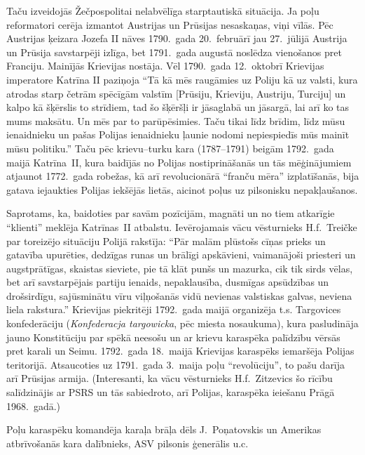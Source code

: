 \documentclass[twoside,a5paper,12pt,fleqn,openany]{extbook}
\newcommand{\pltxti}[1]{\textit{\textpolish{#1}}}
\begin{document}
Taču izveidojās Žečpospolitai nelabvēlīga starptautiskā situācija. Ja poļu reformatori cerēja izmantot Austrijas un Prūsijas nesaskaņas, viņi vīlās. Pēc Austrijas ķeizara Jozefa II nāves 1790.~gada 20.~februārī jau 27.~jūlijā Austrija un Prūsija savstarpēji izlīga, bet 1791.~gada augustā noslēdza vienošanos pret Franciju. Mainījās Krievijas nostāja. Vēl 1790.~gada 12.~oktobrī Krievijas imperatore Katrīna II paziņoja ``Tā kā mēs raugāmies uz Poliju kā uz valsti, kura atrodas starp četrām spēcīgām valstīm [Prūsiju, Krieviju, Austriju, Turciju] un kalpo kā šķērslis to strīdiem, tad šo šķēršļi ir jāsaglabā un jāsargā, lai arī ko tas mums maksātu. Un mēs par to parūpēsimies. Taču tikai līdz brīdim, līdz mūsu ienaidnieku un pašas Polijas ienaidnieku ļaunie nodomi nepiespiedīs mūs mainīt mūsu politiku.'' Taču pēc krievu--turku kara (1787--1791) beigām 1792.~gada maijā Katrīna~II, kura baidījās no Polijas nostiprināšanās un tās mēģinājumiem atjaunot 1772.~gada robežas, kā arī revolucionārā ``franču mēra'' izplatīšanās, bija gatava iejaukties Polijas iekšējās lietās, aicinot poļus uz pilsonisku nepakļaušanos.

Saprotams, ka, baidoties par savām pozīcijām, magnāti un no tiem atkarīgie ``klienti'' meklēja Katrīnas~II atbalstu. Ievērojamais vācu vēsturnieks H.f.~Treičke par toreizējo situāciju Polijā rakstīja: ``Pār malām plūstošs cīņas prieks un gatavība upurēties, dedzīgas runas un brālīgi apskāvieni, vaimanājoši priesteri un augstprātīgas, skaistas sieviete, pie tā klāt punšs un mazurka, cik tik sirds vēlas, bet arī savstarpējais partiju ienaids, nepaklausība, dusmīgas apsūdzības un drošsirdīgu, sajūsminātu vīru viļņošanās vidū nevienas valstiskas galvas, neviena liela rakstura.'' Krievijas piekritēji 1792.~gada maijā organizēja t.s. Targovices konfederāciju (\pltxti{Konfederacja targowicka}, pēc miesta nosaukuma), kura pasludināja jauno Konstitūciju par spēkā neesošu un ar krievu karaspēka palīdzību vērsās pret karali un Seimu. 1792.~gada 18.~maijā Krievijas karaspēks iemaršēja Polijas teritorijā. Atsaucoties uz 1791.~gada 3.~maija poļu ``revolūciju'', to pašu darīja arī Prūsijas armija. (Interesanti, ka vācu vēsturnieks H.f.~Zitzevics šo rīcību salīdzinājis ar PSRS un tās sabiedroto, arī Polijas, karaspēka ieiešanu Prāgā 1968.~gadā.)

Poļu karaspēku komandēja karaļa brāļa dēls J.~Poņatovskis un Amerikas atbrīvošanās kara dalībnieks, ASV pilsonis ģenerālis  u.c.
\end{document}
